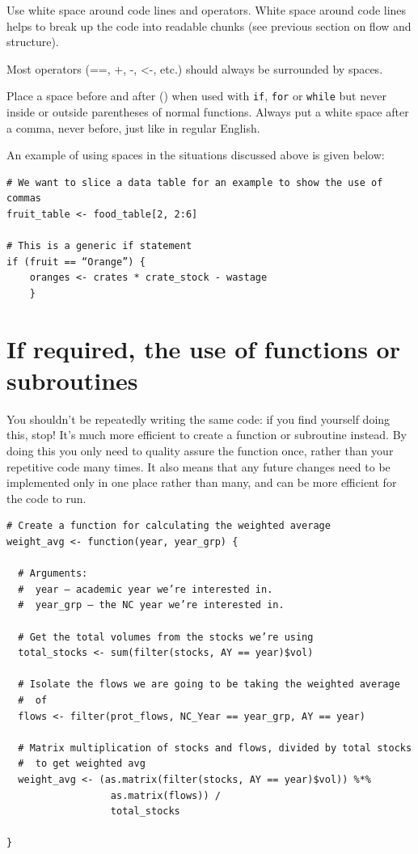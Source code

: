 \documentclass[
]{book}
\begin{document}
Use white space around code lines and operators. White space around code lines helps to break up the code into readable chunks (see previous section on flow and structure).

Most operators (==, +, -, \textless-, etc.) should always be surrounded by spaces.

Place a space before and after () when used with \texttt{if}, \texttt{for} or \texttt{while} but never inside or outside parentheses of normal functions. Always put a white space after a comma, never before, just like in regular English.

An example of using spaces in the situations discussed above is given below:

\begin{verbatim}
# We want to slice a data table for an example to show the use of commas
fruit_table <- food_table[2, 2:6]

# This is a generic if statement
if (fruit == “Orange”) {
    oranges <- crates * crate_stock - wastage
    }
\end{verbatim}

\hypertarget{if-required-the-use-of-functions-or-subroutines}{%
\section{If required, the use of functions or subroutines}\label{if-required-the-use-of-functions-or-subroutines}}

You shouldn't be repeatedly writing the same code: if you find yourself doing this, stop! It's much more efficient to create a function or subroutine instead. By doing this you only need to quality assure the function once, rather than your repetitive code many times. It also means that any future changes need to be implemented only in one place rather than many, and can be more efficient for the code to run.

\begin{verbatim}
# Create a function for calculating the weighted average
weight_avg <- function(year, year_grp) {
    
  # Arguments:
  #  year – academic year we’re interested in.
  #  year_grp – the NC year we’re interested in.
  
  # Get the total volumes from the stocks we’re using
  total_stocks <- sum(filter(stocks, AY == year)$vol)
  
  # Isolate the flows we are going to be taking the weighted average 
  #  of
  flows <- filter(prot_flows, NC_Year == year_grp, AY == year)
  
  # Matrix multiplication of stocks and flows, divided by total stocks
  #  to get weighted avg
  weight_avg <- (as.matrix(filter(stocks, AY == year)$vol)) %*%
                  as.matrix(flows)) / 
                  total_stocks

}
\end{verbatim}
\end{document}

